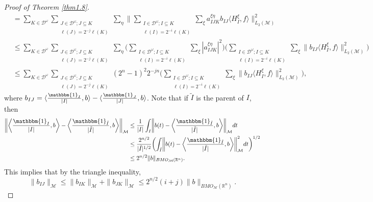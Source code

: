 \documentclass[oneside,english,a4wide]{amsart}
\numberwithin{equation}{section}
\numberwithin{figure}{section}
\theoremstyle{plain}
\theoremstyle{plain}
\theoremstyle{definition}
\theoremstyle{plain}
\theoremstyle{remark}
\theoremstyle{definition}
\theoremstyle{remark}
\theoremstyle{definition}
\newcommand{\8}{\infty}
\begin{document}
\begin{proof}[Proof of Theorem \ref{thm1.8}]
\begin{equation}
\begin{aligned}
			&=\sum_{K\in\mathcal{D}^\omega}\sum_{\substack{J\in\mathcal{D}^\omega;J\subseteq K\\ \ell(J)=2^{-j}\ell(K)}}\sum_{\eta}\biggl\|\sum_{\substack{I\in\mathcal{D}^\omega;I\subseteq K\\ \ell(I)=2^{-i}\ell(K)}}\sum_{\xi}a_{IJK}^{\xi\eta}b_{IJ}\langle H^\xi_I,f\rangle \biggr\|^2_{L_2(\mathcal{M})}\\
			&\le \sum_{K\in\mathcal{D}^\omega}\sum_{\substack{J\in\mathcal{D}^\omega;J\subseteq K\\ \ell(J)=2^{-j}\ell(K)}}\sum_{\eta}\biggl(\sum_{\substack{I\in\mathcal{D}^\omega;I\subseteq K\\ \ell(I)=2^{-i}\ell(K)}}\sum_{\xi}|a_{IJK}^{\xi\eta}|^2\biggr)\biggl(\sum_{\substack{I\in\mathcal{D}^\omega;I\subseteq K\\ \ell(I)=2^{-i}\ell(K)}}\sum_{\xi}\|b_{IJ}\langle H_I^\xi,f\rangle\|_{L_2(\mathcal{M})}^2\biggr)\\
			&\leq \sum_{K\in\mathcal{D}^\omega}\sum_{\substack{J\in\mathcal{D}^\omega;J\subseteq K\\ \ell(J)=2^{-j}\ell(K)}} (2^n-1)^2 2^{-jn}\biggl(\sum_{\substack{I\in\mathcal{D}^\omega;I\subseteq K\\ \ell(I)=2^{-i}\ell(K)}}\sum_{\xi}\|b_{IJ}\langle H_I^\xi,f\rangle\|_{L_2(\mathcal{M})}^2\biggr),
		\end{aligned}
	\end{equation}
	where $b_{IJ}= \langle \frac{\mathbbm{1}_I}{|I|},b\rangle-\langle \frac{\mathbbm{1}_J}{|J|},b\rangle$.
	Note that if $\tilde{I}$ is the parent of $I$, then
	\begin{equation*}
		\begin{aligned}
			\bigg\|\biggl\langle \frac{\mathbbm{1}_I}{|I|},b\biggr\rangle-\biggl\langle\frac{\mathbbm{1}_{\tilde{I}}}{|\tilde{I}|},b\biggr\rangle\bigg\|_{\mathcal{M}}{}
			&\le \frac{1}{|I|}\int_I \biggl\|b(t)-\biggl\langle\frac{\mathbbm{1}_{\tilde{I}}}{|\tilde{I}|},b\bigg\rangle\biggr\|_{\mathcal{M}}dt\\
			&\leq\frac{2^{n/2}}{|\tilde{I}|^{1/2}}\biggl(\int_{\tilde{I}}\biggl\|b(t)-\biggl\langle\frac{\mathbbm{1}_{\tilde{I}}}{|\tilde{I}|},b\bigg\rangle\biggr\|^2_{\mathcal{M}}dt\biggr)^{1/2}\\
			&\le 2^{n/2}\|b\|_{BMO_\mathcal{M}(\mathbb{R}^n)}.
		\end{aligned}
	\end{equation*}
	This implies that by the triangle inequality,
	\begin{equation*}
		\|b_{IJ}\|_{\mathcal{M}}\leq\|b_{IK}\|_{\mathcal{M}}+\|b_{JK}\|_{\mathcal{M}} \le  2^{n/2}(i+j)\|b\|_{BMO_\mathcal{M}(\mathbb{R}^n)}.

\end{equation*}
\end{proof}
\end{document}
